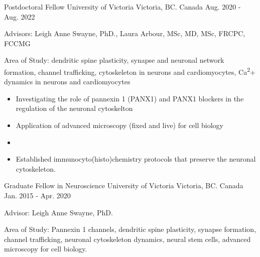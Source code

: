 

\begin{cventries}

  \cventry
    {Postdoctoral Fellow} %
    {University of Victoria} %
    {Victoria, BC. Canada} %
    {Aug. 2020 - Aug. 2022} %
    {
      \begin{cvitems} %
        \item {Advisors: Leigh Anne Swayne, PhD., Laura Arbour, MSc, MD, MSc, FRCPC, FCCMG}
        \item {Area of Study: dendritic spine plasticity, synapse and neuronal network formation, channel trafficking, cytoskeleton in neurons and cardiomyocytes, Ca{\textsuperscript2+} dynamics in neurons and cardiomyocytes}
        \begin{itemize}
          \begin{itemize}
            \item {Investigating the role of pannexin 1 (PANX1) and PANX1 blockers in the regulation of the neuronal cytoskelton}
            \item {Application of advanced microscopy (fixed and live) for cell biology}
            \item {}
            \item {Established immunocyto(histo)chemistry protocols that preserve the neuronal cytoskeleton.}
            \end{itemize}
        \end{itemize}
      \end{cvitems}
      }
  \cventry
    {Graduate Fellow in Neuroscience} %
    {University of Victoria} %
    {Victoria, BC. Canada} %
    {Jan. 2015 - Apr. 2020} %
    {
      \begin{cvitems} %
        \item {Advisor: Leigh Anne Swayne, PhD.}
        \item {Area of Study: Pannexin 1 channels, dendritic spine plasticity, synapse formation, channel trafficking, neuronal cytoskeleton dynamics, neural stem cells, advanced microscopy for cell biology.}

\end{cvitems}}
\end{cventries}
